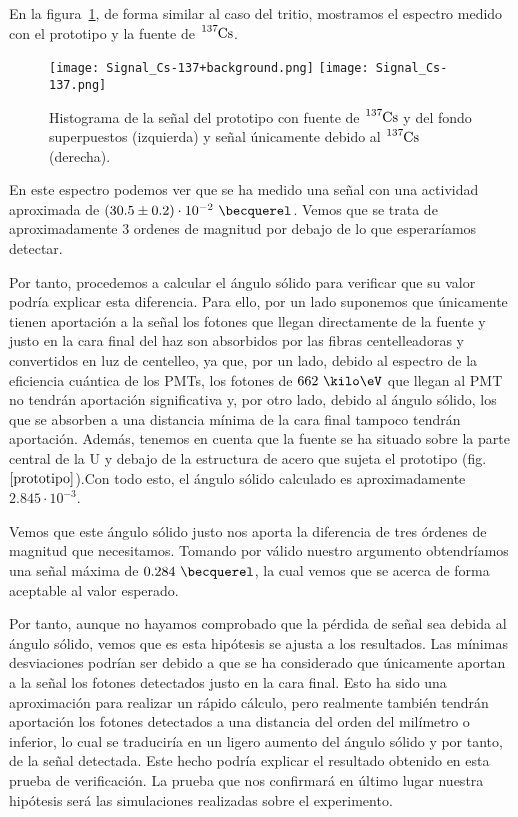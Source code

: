 En la figura~\ref{senalcesio}, de forma similar al caso del tritio, mostramos el espectro medido con el prototipo y la fuente de $\ce{^{137}Cs}$.

\begin{figure}[htb]
\centering
{
\texttt{[image: Signal\_Cs-137+background.png]} 
}
{
\texttt{[image: Signal\_Cs-137.png]} 
}
\caption{Histograma de la señal del prototipo con fuente de $\ce{^{137}Cs}$ y del fondo superpuestos (izquierda) y señal únicamente debido al $\ce{^{137}Cs}$ (derecha).\label{senalcesio}}
\end{figure}

En este espectro podemos ver que se ha medido una señal con una actividad aproximada de $(30.5 \pm 0.2) \cdot 10^{-2}~\becquerel$. Vemos que se trata de aproximadamente 3 ordenes de magnitud por debajo de lo que esperaríamos detectar.

Por tanto, procedemos a calcular el ángulo sólido para verificar que su valor podría explicar esta diferencia. Para ello, por un lado suponemos que únicamente tienen aportación a la señal los fotones que llegan directamente de la fuente y justo en la cara final del haz son absorbidos por las fibras centelleadoras y convertidos en luz de centelleo,  ya que, por un lado, debido al espectro de la eficiencia cuántica de los PMTs, los fotones de $662~\kilo\eV$ que llegan al PMT no tendrán aportación significativa y, por otro lado, debido al ángulo sólido, los que se absorben a una distancia mínima de la cara final tampoco tendrán aportación. Además, tenemos en cuenta que la fuente se ha situado sobre la parte central de la U y debajo de la estructura de acero que sujeta el prototipo (fig. $\ref{prototipo}$).Con todo esto, el ángulo sólido calculado es aproximadamente $2.845 \cdotp 10^{-3}$. 

Vemos que este ángulo sólido justo nos aporta la diferencia de tres órdenes de magnitud que necesitamos. Tomando por válido nuestro argumento obtendríamos una señal máxima de $0.284~\becquerel$, la cual vemos que se acerca de forma aceptable al valor esperado.

Por tanto, aunque no hayamos comprobado que la pérdida de señal sea debida al ángulo sólido, vemos que es esta hipótesis se ajusta  a los resultados. Las mínimas desviaciones podrían ser debido a que se ha considerado que únicamente aportan a la señal los fotones detectados justo en la cara final. Esto ha sido una aproximación para realizar un rápido cálculo, pero realmente también tendrán aportación los fotones detectados a una distancia del orden del milímetro o inferior, lo cual se traduciría en un ligero aumento del ángulo sólido y por tanto, de la señal detectada. Este hecho podría explicar  el resultado obtenido en esta prueba de verificación. La prueba que nos confirmará en último lugar nuestra hipótesis será las simulaciones realizadas sobre el experimento.
